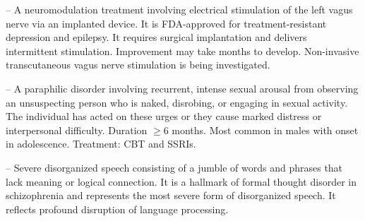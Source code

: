 -- A neuromodulation treatment involving electrical stimulation of the left vagus nerve via an implanted device. It is FDA-approved for treatment-resistant depression and epilepsy. It requires surgical implantation and delivers intermittent stimulation. Improvement may take months to develop. Non-invasive transcutaneous vagus nerve stimulation is being investigated.

-- A paraphilic disorder involving recurrent, intense sexual arousal from observing an unsuspecting person who is naked, disrobing, or engaging in sexual activity. The individual has acted on these urges or they cause marked distress or interpersonal difficulty. Duration \(\ge\)6 months. Most common in males with onset in adolescence. Treatment: CBT and SSRIs.

-- Severe disorganized speech consisting of a jumble of words and phrases that lack meaning or logical connection. It is a hallmark of formal thought disorder in schizophrenia and represents the most severe form of disorganized speech. It reflects profound disruption of language processing.
